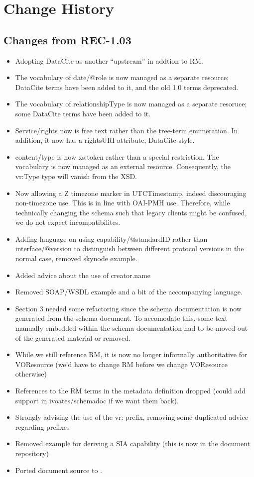 \documentclass[11pt,a4paper]{ivoa}
\begin{document}
\appendix

\section{Change History}

\subsection{Changes from REC-1.03}

\begin{itemize}
\item Adopting DataCite as another ``upstream'' in addtion to RM.
\item The vocabulary of date/@role is now managed as a separate
resource; DataCite terms have been added to it, and the old 1.0 terms
deprecated.
\item The vocabulary of relationshipType is now managed as a separate
resoruce; some DataCite terms have been added to it.
\item Service/rights now is free text rather than the tree-term
enumeration.  In addition, it now has a rightsURI attribute,
DataCite-style.
\item content/type is now xs:token rather than a special restriction.
The vocabulary is now managed as an external resource.
Consequently, the vr:Type type will vanish from the XSD.
\item Now allowing a Z timezone marker in UTCTimestamp, indeed
discouraging non-timezone use.  This is in line with OAI-PMH use.
Therefore, while technically changing the schema such that legacy
clients  might be confused, we do not expect incompatibilites.
\item Adding language on using capability/@standardID rather than
interface/@version to distinguish between different protocol versions in
the normal case, removed skynode example.
\item Added advice about the use of creator.name
\item Removed SOAP/WSDL example and a bit of the accompanying language.
\item Section 3 needed some refactoring since the schema documentation
is now generated from the schema document.  To accomodate this, some
text manually embedded within the schema documentation had to be moved
out of the generated material or removed.
\item While we still reference RM, it is now no longer informally
authoritative for VOResource (we'd have to change RM before we change
VOResource otherwise)
\item References to the RM terms in the metadata definition dropped
(could add support in ivoates/schemadoc if we want them back).
\item Strongly advising the use of the vr: prefix, removing some
duplicated advice regarding prefixes
\item Removed example for deriving a SIA capability (this is now
in the document repository)
\item Ported document source to \ivoatex.
\end{itemize}
\end{document}
